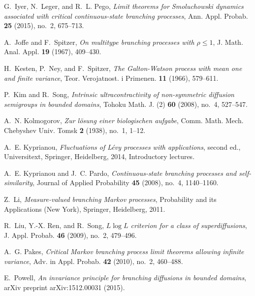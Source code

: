 \documentclass[12pt, a4paper]{amsart}
\theoremstyle{definition}
\numberwithin{equation}{section}
\begin{document}
\begin{thebibliography}{10}
	G.~Iyer, N.~Leger, and R.~L. Pego, \emph{Limit theorems for {S}moluchowski
		dynamics associated with critical continuous-state branching processes}, Ann.
	Appl. Probab. \textbf{25} (2015), no.~2, 675--713. 
	
	A.~Joffe and F.~Spitzer, \emph{On multitype branching processes with {$\rho
			\leq 1$}}, J. Math. Anal. Appl. \textbf{19} (1967), 409--430. 
	
	H.~Kesten, P.~Ney, and F.~Spitzer, \emph{The {G}alton-{W}atson process with
		mean one and finite variance}, Teor. Verojatnost. i Primenen. \textbf{11}
	(1966), 579--611. 
	
	P.~Kim and R.~Song, \emph{Intrinsic ultracontractivity of non-symmetric
		diffusion semigroups in bounded domains}, Tohoku Math. J. (2) \textbf{60}
	(2008), no.~4, 527--547. 
	
	A.~N. Kolmogorov, \emph{Zur l{\"o}sung einer biologischen aufgabe}, Comm. Math.
	Mech. Chebyshev Univ. Tomsk \textbf{2} (1938), no.~1, 1--12.
	
	A.~E. Kyprianou, \emph{Fluctuations of {L}{\'e}vy processes with applications},
	second ed., Universitext, Springer, Heidelberg, 2014, Introductory lectures.
	
	A.~E. Kyprianou and J.~C. Pardo, \emph{Continuous-state branching processes and
		self-similarity}, Journal of Applied Probability \textbf{45} (2008), no.~4,
	1140--1160.
	
	Z.~Li, \emph{Measure-valued branching {M}arkov processes}, Probability and its
	Applications (New York), Springer, Heidelberg, 2011. 
	
	R.~Liu, Y.-X. Ren, and R.~Song, \emph{{$L\log L$} criterion for a class of
		superdiffusions}, J. Appl. Probab. \textbf{46} (2009), no.~2, 479--496.
	
	A.~G. Pakes, \emph{Critical {M}arkov branching process limit theorems allowing
		infinite variance}, Adv. in Appl. Probab. \textbf{42} (2010), no.~2,
	460--488. 
	
	E.~Powell, \emph{An invariance principle for branching diffusions in bounded
		domains}, arXiv preprint arXiv:1512.00031 (2015).
	

\end{thebibliography}
\end{document}
